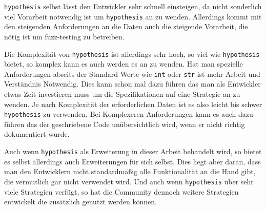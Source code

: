 \lstinline{hypothesis} selbst lässt den Entwickler sehr schnell einsteigen, da nicht sonderlich
viel Vorarbeit notwendig ist um \lstinline{hypothesis} an zu wenden. Allerdings kommt mit den
steigenden Anforderungen an die Daten auch die steigende Vorarbeit, die nötig ist um
\gls{fuzz}-testing zu betreiben.

Die Komplexität von \lstinline{hypothesis} ist allerdings sehr hoch, so viel wie
\lstinline{hypothesis} bietet, so komplex kann es auch werden es an zu wenden. Hat man spezielle
Anforderungen abseits der Standard Werte wie \lstinline{int} oder \lstinline{str}
ist mehr Arbeit und Verständnis Notwendig. Dies kann schon mal dazu führen das man als
Entwickler etwas Zeit investieren muss um die Spezifikationen auf eine Strategie an zu wenden.
Je nach Komplexität der erforderlichen Daten ist es also leicht bis schwer \lstinline{hypothesis}
zu verwenden. Bei Komplexeren Anforderungen kann es auch dazu führen das der geschriebene Code
unübersichtlich wird, wenn er nicht richtig dokumentiert wurde.

Auch wenn \lstinline{hypothesis} als Erweiterung in dieser Arbeit behandelt wird, so bietet es selbst
allerdings auch Erweiterungen für sich selbst. Dies liegt aber daran, dass man den Entwicklern
nicht standardmäßig alle Funktionalität an die Hand gibt, die vermutlich gar nicht verwendet wird.
Und auch wenn \lstinline{hypothesis} über sehr viele Strategien verfügt, so hat die Community dennoch
weitere Strategien entwickelt die zusätzlich genutzt werden können.
